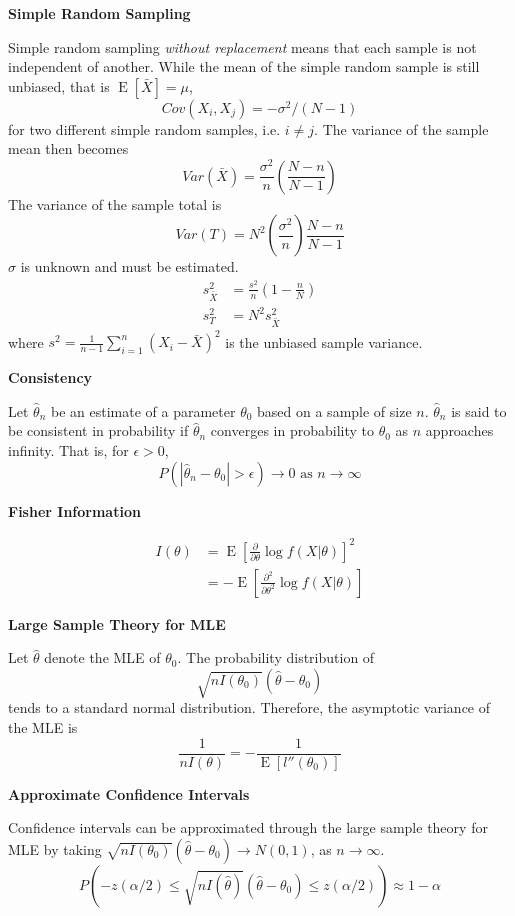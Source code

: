 \documentclass[a4paper]{article}
\newcommand{\subheading}[1]{{\scriptsize\textbf{#1}}}
\renewenvironment{section}[1]
  {
    \subheading{#1}

  }{
    \smallskip
  }
\newcommand{\expectation}[1]{\operatorname{E}[#1]}
\begin{document}
\begin{multicols*}{4}
\begin{section}{Simple Random Sampling}
  Simple random sampling \textit{without replacement} means that each sample is
  not independent of another. While the mean of the simple random sample is
  still unbiased, that is $\expectation{\bar{X}} = \mu$,
  $$Cov(X_i, X_j) = -\sigma^2 / (N-1)$$
  for two different simple random samples, i.e. $i \neq j$. The variance of the
  sample mean then becomes
  $$Var(\bar{X}) = \frac{\sigma^2}{n} \left ( \frac{N - n}{N - 1} \right )$$
  The variance of the sample total is
  $$Var(T) = N^2 \left ( \frac{\sigma^2}{n} \right ) \frac{N- n}{N-1}$$
  $\sigma$ is unknown and must be estimated. 
  \begin{align*}
    s^2_{\bar{X}} &= \frac{s^2}{n} \left ( 1 - \frac{n}{N} \right ) \\
    s^2_T &= N^2 s^2_{\bar{X}}
  \end{align*}
  where $s^2 = \frac{1}{n-1}\sum^n_{i=1}(X_i - \bar{X})^2$ is the unbiased
  sample variance.
\end{section}

\begin{section}{Consistency}
  Let $\hat{\theta}_n$ be an estimate of a parameter $\theta_0$ based on a
  sample of size $n$. $\hat{\theta}_n$ is said to be consistent in probability if
  $\hat{\theta}_n$ converges in probability to $\theta_0$ as $n$ approaches
  infinity. That is, for $\epsilon > 0$,
  $$P(|\hat{\theta}_n - \theta_0| > \epsilon) \rightarrow 0 \text{ as } n
  \rightarrow \infty$$
\end{section}

\begin{section}{Fisher Information}
  \begin{align*}
    I(\theta) &= \operatorname{E} \left [
      \frac{\partial}{\partial\theta} \log f(X|\theta)
    \right ]^2 \\
      &= - \operatorname{E} \left [
        \frac{\partial^2}{\partial\theta^2} \log f(X|\theta)
    \right ]
  \end{align*}
\end{section}

\begin{section}{Large Sample Theory for MLE}
  Let $\hat{\theta}$ denote the MLE of $\theta_0$. The probability distribution
  of
  $$\sqrt{nI(\theta_0)}(\hat{\theta} - \theta_0)$$
  tends to a standard normal distribution. Therefore, the asymptotic variance of
  the MLE is
  $$\frac{1}{nI(\theta)} = - \frac{1}{\expectation{l''(\theta_0)}}$$
\end{section}

\begin{section}{Approximate Confidence Intervals}
  Confidence intervals can be approximated through the large sample theory for
  MLE by taking $\sqrt{nI(\theta_0)}(\hat{\theta}-\theta_0) \rightarrow N(0,
  1)$, as $n \rightarrow \infty$. \smallskip
  $$P \left (
    -z(\alpha/2) \leq
    \sqrt{nI(\hat{\theta})}(\hat{\theta} - \theta_0) \leq
    z(\alpha/2)
  \right ) \approx 1 - \alpha$$
\end{section}

\end{multicols*}
\end{document}
